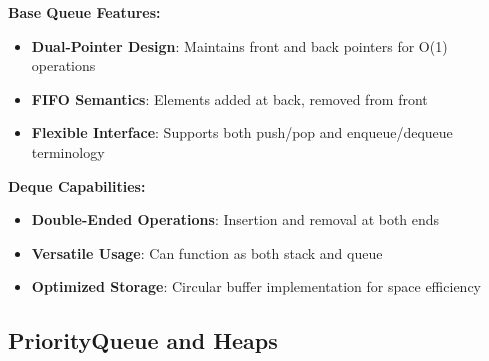 \documentclass[11pt,a4paper]{article}
\begin{document}
\textbf{Base Queue Features:}
\begin{itemize}
    \item \textbf{Dual-Pointer Design}: Maintains front and back pointers for O(1) operations
    \item \textbf{FIFO Semantics}: Elements added at back, removed from front
    \item \textbf{Flexible Interface}: Supports both push/pop and enqueue/dequeue terminology
\end{itemize}

\textbf{Deque Capabilities:}
\begin{itemize}
    \item \textbf{Double-Ended Operations}: Insertion and removal at both ends
    \item \textbf{Versatile Usage}: Can function as both stack and queue
    \item \textbf{Optimized Storage}: Circular buffer implementation for space efficiency
\end{itemize}

\subsection{PriorityQueue and Heaps}
\end{document}
